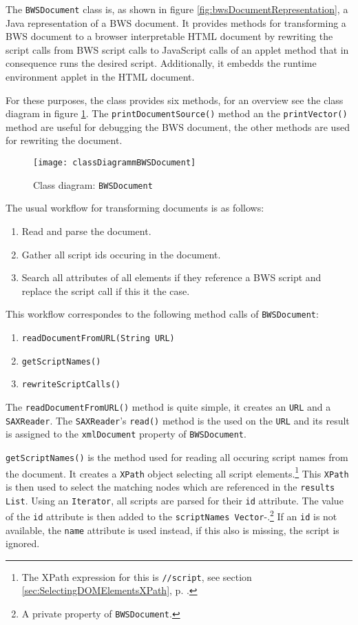 The \texttt{BWSDocument} class is, as shown in figure \ref{fig:bwsDocumentRepresentation}, a Java representation of a BWS document. It provides methods for transforming a BWS document to a browser interpretable HTML document by rewriting the script calls from BWS script calls to JavaScript calls of an applet method that in consequence runs the desired script. Additionally, it embedds the runtime environment applet in the HTML document.

For these purposes, the class provides six methods, for an overview see the class diagram in figure \ref{fig:classDiagrammBWSDocument}. The \texttt{printDocumentSource()} method an the \texttt{printVector()} method are useful for debugging the BWS document, the other methods are used for rewriting the document.

\begin{figure}
	\centering
		\texttt{[image: classDiagrammBWSDocument]}
	\caption{Class diagram: \texttt{BWSDocument}}
	\label{fig:classDiagrammBWSDocument}
\end{figure}

The usual workflow for transforming documents is as follows:

\begin{enumerate}
	\item Read and parse the document.
	\item Gather all script ids occuring in the document.
	\item Search all attributes of all elements if they reference a BWS script and replace the script call if this it the case.
\end{enumerate}

This workflow correspondes to the following method calls of \texttt{BWSDocument}:

\begin{enumerate}
	\item \texttt{readDocumentFromURL(String URL)}
	\item \texttt{getScriptNames()}
	\item \texttt{rewriteScriptCalls()}
\end{enumerate}

The \texttt{readDocumentFromURL()} method is quite simple, it creates an \texttt{URL} and a \texttt{SAXReader}. The \texttt{SAXReader}'s \texttt{read()} method is the used on the \texttt{URL} and its result is assigned to the \texttt{xmlDocument} property of \texttt{BWSDocument}.

\texttt{getScriptNames()} is the method used for reading all occuring script names from the document. It creates a \texttt{XPath} object selecting all script elements.\footnote{The XPath expression for this is \texttt{//script}, see section \ref{sec:SelectingDOMElementsXPath}, p. \pageref{sec:SelectingDOMElementsXPath}.} This \texttt{XPath} is then used to select the matching nodes which are referenced in the \texttt{results List}. Using an \texttt{Iterator}, all scripts are parsed for their \texttt{id} attribute. The value of the \texttt{id} attribute is then added to the \texttt{scriptNames Vector}-.\footnote{A private property of \texttt{BWSDocument}.} If an \texttt{id} is not available, the \texttt{name} attribute is used instead, if this also is missing, the script is ignored.

